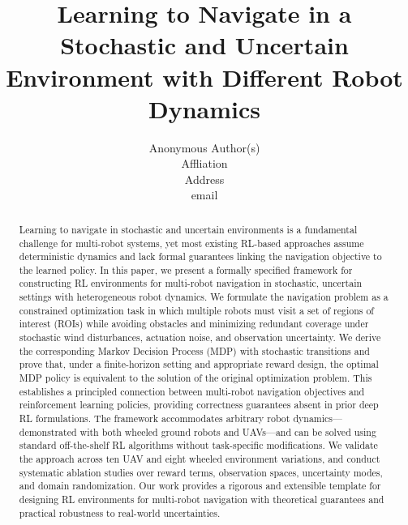 \documentclass[letterpaper, 10 pt, conference]{ieeeconf}  %
\title{\LARGE \bf Learning to Navigate in a Stochastic and Uncertain Environment with Different Robot Dynamics}
\author{
    Anonymous Author(s)\\
    Affliation \\
    Address \\
    {email}
}
\begin{document}
\maketitle
\thispagestyle{empty}
\pagestyle{empty}


\begin{abstract}
Learning to navigate in stochastic and uncertain environments is a fundamental challenge for multi-robot systems, yet most existing RL-based approaches assume deterministic dynamics and lack formal guarantees linking the navigation objective to the learned policy. In this paper, we present a formally specified framework for constructing RL environments for multi-robot navigation in stochastic, uncertain settings with heterogeneous robot dynamics. We formulate the navigation problem as a constrained optimization task in which multiple robots must visit a set of regions of interest (ROIs) while avoiding obstacles and minimizing redundant coverage under stochastic wind disturbances, actuation noise, and observation uncertainty. We derive the corresponding Markov Decision Process (MDP) with stochastic transitions and prove that, under a finite-horizon setting and appropriate reward design, the optimal MDP policy is equivalent to the solution of the original optimization problem. This establishes a principled connection between multi-robot navigation objectives and reinforcement learning policies, providing correctness guarantees absent in prior deep RL formulations. The framework accommodates arbitrary robot dynamics—demonstrated with both wheeled ground robots and UAVs—and can be solved using standard off-the-shelf RL algorithms without task-specific modifications. We validate the approach across ten UAV and eight wheeled environment variations, and conduct systematic ablation studies over reward terms, observation spaces, uncertainty modes, and domain randomization. Our work provides a rigorous and extensible template for designing RL environments for multi-robot navigation with theoretical guarantees and practical robustness to real-world uncertainties.
\end{abstract}
\end{document}
